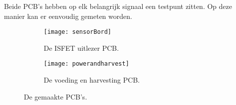 Beide PCB's hebben op elk belangrijk signaal een testpunt zitten. Op deze manier kan er eenvoudig gemeten worden.


\begin{figure}[ht]
    \centering
    \begin{subfigure}[b]{0.48\textwidth}
        \centering
        \texttt{[image: sensorBord]}
        \caption{De ISFET uitlezer PCB.} 
        \label{fig:sensorPCB}
    \end{subfigure}
    \hfill
    \begin{subfigure}[b]{0.60\textwidth}
        \centering
        \texttt{[image: powerandharvest]}
        \caption{De voeding en harvesting PCB.} 
        \label{fig:powerPCB}
    \end{subfigure}
    \caption{De gemaakte PCB's.}
    \label{fig:PCBs}
\end{figure}